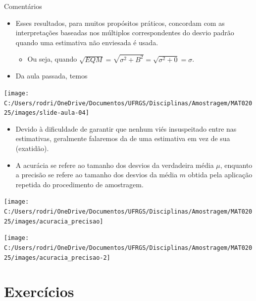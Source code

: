 \documentclass[
  10pt,
  ignorenonframetext,
]{beamer}
\providecommand{\tightlist}{%
  \setlength{\itemsep}{0pt}\setlength{\parskip}{0pt}}
\begin{document}
\begin{frame}[allowframebreaks]{Comentários}
\protect\hypertarget{comentuxe1rios}{}
\begin{itemize}
\tightlist
\item
  Esses resultados, para muitos propósitos práticos, concordam com as
  interpretações baseadas nos múltiplos correspondentes do desvio padrão
  quando uma estimativa não enviesada é usada.

  \begin{itemize}
  \tightlist
  \item
    Ou seja, quando
    \(\sqrt{EQM} = \sqrt{\sigma^2 + B^2} = \sqrt{\sigma^2 + 0} = \sigma\).
  \end{itemize}
\item
  Da aula passada, temos
\end{itemize}

\begin{center}\texttt{[image: C:/Users/rodri/OneDrive/Documentos/UFRGS/Disciplinas/Amostragem/MAT02025/images/slide-aula-04]} \end{center}

\framebreak

\scriptsize

\begin{itemize}
\tightlist
\item
  Devido à dificuldade de garantir que nenhum viés insuspeitado entre
  nas estimativas, geralmente falaremos da  de uma
  estimativa em vez de sua  (exatidão).
\item
  A acurácia se refere ao tamanho dos desvios da verdadeira média
  \(\mu\), enquanto a precisão se refere ao tamanho dos desvios da média
  \(m\) obtida pela aplicação repetida do procedimento de amostragem.
\end{itemize}

\begin{center}\texttt{[image: C:/Users/rodri/OneDrive/Documentos/UFRGS/Disciplinas/Amostragem/MAT02025/images/acuracia\_precisao]} \end{center}

\framebreak

\begin{center}\texttt{[image: C:/Users/rodri/OneDrive/Documentos/UFRGS/Disciplinas/Amostragem/MAT02025/images/acuracia\_precisao-2]} \end{center}
\end{frame}

\hypertarget{exercuxedcios}{%
\section{Exercícios}\label{exercuxedcios}}
\end{document}
